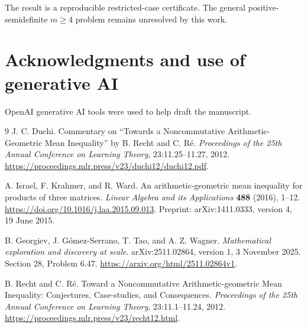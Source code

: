 \documentclass[11pt,letterpaper]{article}
\begin{document}
The result is a reproducible restricted-case certificate. The general positive-semidefinite $m\ge4$ problem remains unresolved by this work.

\section*{Acknowledgments and use of generative AI}
OpenAI generative AI tools were used to help draft the manuscript.

\begin{thebibliography}{9}
J. C. Duchi.
Commentary on ``Towards a Noncommutative Arithmetic-Geometric Mean Inequality'' by B. Recht and C. R\'e.
\emph{Proceedings of the 25th Annual Conference on Learning Theory},
23:11.25--11.27, 2012.
\url{https://proceedings.mlr.press/v23/duchi12/duchi12.pdf}.

A. Israel, F. Krahmer, and R. Ward.
An arithmetic-geometric mean inequality for products of three matrices.
\emph{Linear Algebra and its Applications} \textbf{488} (2016), 1--12.
\url{https://doi.org/10.1016/j.laa.2015.09.013}.
Preprint: arXiv:1411.0333, version 4, 19 June 2015.

B. Georgiev, J. G\'omez-Serrano, T. Tao, and A. Z. Wagner.
\emph{Mathematical exploration and discovery at scale}.
arXiv:2511.02864, version 1, 3 November 2025.
Section 28, Problem 6.47.
\url{https://arxiv.org/html/2511.02864v1}.

B. Recht and C. R\'e.
Toward a Noncommutative Arithmetic-geometric Mean Inequality:
Conjectures, Case-studies, and Consequences.
\emph{Proceedings of the 25th Annual Conference on Learning Theory},
23:11.1--11.24, 2012.
\url{https://proceedings.mlr.press/v23/recht12.html}.
\end{thebibliography}
\end{document}
